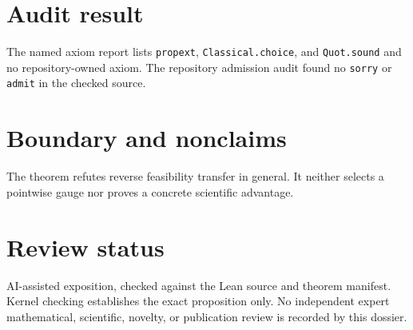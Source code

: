\documentclass[11pt]{article}
\begin{document}
\section{Audit result}
The named axiom report lists \texttt{propext}, \texttt{Classical.choice}, and
\texttt{Quot.sound} and no repository-owned axiom.  The repository admission audit found no
\texttt{sorry} or \texttt{admit} in the checked source.

\section{Boundary and nonclaims}
The theorem refutes reverse feasibility transfer in general.  It neither selects a pointwise gauge nor proves a concrete scientific advantage.

\section{Review status}
AI-assisted exposition, checked against the Lean source and theorem manifest.  Kernel checking
establishes the exact proposition only.  No independent expert mathematical, scientific,
novelty, or publication review is recorded by this dossier.
\end{document}
